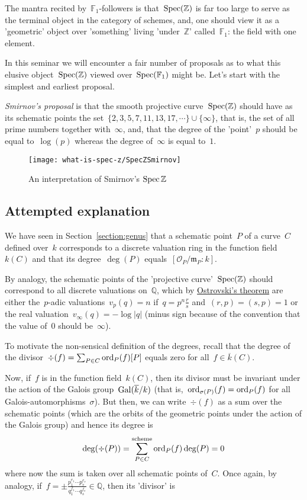 The mantra recited by~$\mathbb{F}_1$-followers is that~$\operatorname{Spec}(\mathbb{Z})$ is far too large to serve as the terminal object in the category of schemes, and, one should view it as a 'geometric' object over 'something' living 'under~$\mathbb{Z}$' called~$\mathbb{F}_1$: the field with one element.

In this seminar we will encounter a fair number of proposals as to what this elusive object~$\operatorname{Spec}(\mathbb{Z})$ viewed over~$\operatorname{Spec}(\mathbb{F}_1)$ might be. Let's start with the simplest and earliest proposal.

\emph{Smirnov's proposal} is that the smooth projective curve~$\operatorname{Spec}(\mathbb{Z})$ should have as its schematic points the set~$\{ 2,3,5,7,11,13,17,\cdots \} \cup \{ \infty \}$, that is, the set of all prime numbers together with~$\infty$, and, that the degree of the 'point'~$p$ should be equal to~$\log(p)$ whereas the degree of~$\infty$ is equal to~$1$.

\begin{figure}[ht]
  \centering
  \texttt{[image: what-is-spec-z/SpecZSmirnov]}
  \caption{An interpretation of Smirnov's $\operatorname{Spec}\mathbb{Z}$}
  \label{figure:smirnov-spec-z}
\end{figure}

\subsection{Attempted explanation}
We have seen in Section~\ref{section:genus} that a schematic point~$P$ of a curve~$C$ defined over~$k$ corresponds to a discrete valuation ring in the function field~$k(C)$ and that its degree~$\deg(P)$ equals~$[\mathcal{O}_P/\mathfrak{m}_P : k]$.

By analogy, the schematic points of the 'projective curve'~$\operatorname{Spec}(\mathbb{Z})$ should correspond to all discrete valuations on~$\mathbb{Q}$, which by \href{http://en.wikipedia.org/wiki/Ostrowski's_theorem}{Ostrovski's theorem} are either the~$p$-adic valuations~$v_p(q)=n$ if~$q=p^n \frac{r}{s}$ and~$(r,p)=(s,p)=1$ or the real valuation~$v_{\infty}(q) = -\log |q|$ (minus sign because of the convention that the value of~$0$ should be~$\infty$).

To motivate the non-sensical definition of the degrees, recall that the degree of the divisor~$\div(f) = \sum_{P \in C} \operatorname{ord}_P(f) [P]$ equals zero for all~$f \in \overline{k}(C)$.

Now, if~$f$ is in the function field~$k(C)$, then its divisor must be invariant under the action of the Galois group~$\operatorname{Gal}(\overline{k}/k)$ (that is,~$\operatorname{ord}_{\sigma(P)}(f) = \operatorname{ord}_P(f)$ for all Galois-automorphisms~$\sigma$). But then, we can write~$\div(f)$ as a sum over the schematic points (which are the orbits of the geometric points under the action of the Galois group) and hence its degree is
\begin{equation}
  \deg(\div(P)) = \sum^{\text{scheme}}_{P \in C}\operatorname{ord}_P(f) \deg(P) = 0
\end{equation}
where now the sum is taken over all schematic points of~$C$. Once again, by analogy, if~$f = \pm \frac{p_1^{e_1} \cdots p_r^{e_r}}{q_1^{f_1} \cdots q_s^{f_s}} \in \mathbb{Q}$, then its 'divisor' is


